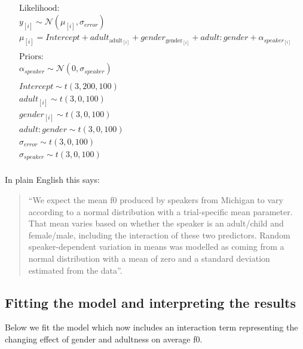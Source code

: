 \documentclass[
]{book}
\begin{document}
\begin{equation}
\begin{split}
\textrm{Likelihood:} \\
y_{[i]} \sim \mathcal{N}(\mu_{[i]},\sigma_{error}) \\
\mu_{[i]} = Intercept + adult_{\textrm{adult}_{[i]}} + gender_{\textrm{gender}_{[i]}}+ adult:gender + \alpha_{speaker_{[i]}} \\\\
\textrm{Priors:} \\
\alpha_{speaker} \sim \mathcal{N}(0,\sigma_{speaker}) \\ \\ 
Intercept \sim t(3, 200, 100) \\ 
adult_{[i]} \sim t(3, 0, 100) \\ 
gender_{[i]} \sim t(3, 0, 100) \\ 
adult:gender \sim t(3, 0, 100) \\ 
\sigma_{error} \sim t(3, 0, 100) \\
\sigma_{speaker} \sim t(3, 0, 100) \\ 
\end{split}
\label{eq:43}
\end{equation}

In plain English this says:

\begin{quote}
``We expect the mean f0 produced by speakers from Michigan to vary according to a normal distribution with a trial-specific mean parameter. That mean varies based on whether the speaker is an adult/child and female/male, including the interaction of these two predictors. Random speaker-dependent variation in means was modelled as coming from a normal distribution with a mean of zero and a standard deviation estimated from the data''.
\end{quote}

\hypertarget{fitting-the-model-and-interpreting-the-results-1}{%
\subsection{Fitting the model and interpreting the results}\label{fitting-the-model-and-interpreting-the-results-1}}

Below we fit the model which now includes an interaction term representing the changing effect of gender and adultness on average f0.
\end{document}
